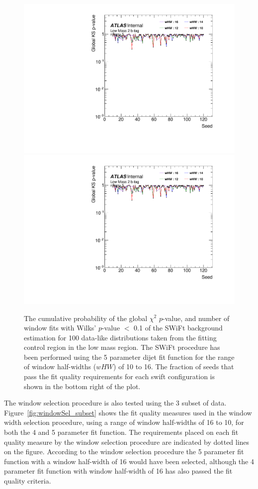 \begin{figure}[!htb]
\captionsetup[subfigure]{aboveskip=0pt,justification=centering}
\centering
{} {
  \includegraphics[width=0.49\linewidth, angle=0,page=7]{figs/Dibjet/LowMass/FitStudy_min566/windowSel_corrFitCR_dataLike_5para.pdf}
}  \hspace{-8mm}
 {
  \includegraphics[width=0.49\linewidth, angle=0,page=9]{figs/Dibjet/LowMass/FitStudy_min566/windowSel_corrFitCR_dataLike_5para.pdf}
}

\caption{\label{fig:windowSel_dataLike}
  The cumulative probability of the global $\chi^{2}$ \mbox{$p$-value}, %
  and number of window fits with Wilks' \mbox{$p$-value} $<$ 0.1 of the SWiFt background estimation for
  100 data-like distributions taken from the fitting control region in the low mass region.
  The SWiFt procedure has been performed using the 5 parameter dijet fit function
  for the range of window half-widths ($wHW$) of 10 to 16.
  The fraction of seeds that pass the fit quality requirements for each swift configuration is shown in the bottom right of the plot.
}
\end{figure}

The window selection procedure is also tested using the 3 \ifb{} subset of data.
Figure~\ref{fig:windowSel_subset} shows the fit quality measures used in the window width selection procedure,
using a range of window half-widths of 16 to 10, for both the 4 and 5 parameter fit function.
The requirements placed on each fit quality measure by the window selection procedure are indicated by dotted lines on the figure.
According to the window selection procedure the 5 parameter fit function with a window half-width of 16 would have been selected,
although the 4 parameter fit function with window half-width of 16 has also passed the fit quality criteria.

